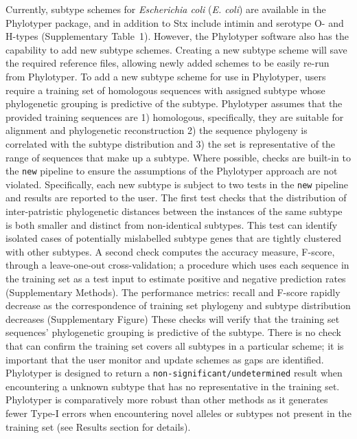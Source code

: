 \documentclass{bioinfo}
\begin{document}
Currently, subtype schemes for \emph{Escherichia coli} (\textit{E. coli}) are available in the Phylotyper package, and in addition to Stx include intimin and serotype O- and H-types  (Supplementary Table~1).
However, the Phylotyper software also has the capability to add new subtype schemes. 
Creating a new subtype scheme will save the required reference files, allowing newly added schemes to be easily re-run from Phylotyper.
To add a new subtype scheme for use in Phylotyper, users require a training set of homologous sequences with assigned subtype whose phylogenetic grouping is predictive of the subtype.
Phylotyper assumes that the provided training sequences are 1) homologous, specifically, they are suitable for alignment and phylogenetic reconstruction 2) the sequence phylogeny is correlated with the subtype distribution and 3) the set is representative of the range of sequences that make up a subtype.
Where possible, checks are built-in to the \texttt{new} pipeline to ensure the assumptions of the Phylotyper approach are not violated.
Specifically, each new subtype is subject to two tests in the \texttt{new} pipeline and results are reported to the user.
The first test checks that the distribution of inter-patristic phylogenetic distances between the instances of the same subtype is both smaller and distinct from non-identical subtypes.
This test can identify isolated cases of potentially mislabelled subtype genes that are tightly clustered with other subtypes.
A second check computes the accuracy measure, F-score, through a leave-one-out cross-validation; a procedure which uses each sequence in the training set as a test input to estimate positive and negative prediction rates (Supplementary Methods).
The performance metrics: recall and F-score rapidly decrease as the correspondence of training set phylogeny and subtype distribution decreases (Supplementary Figure)
These checks will verify that the training set sequences' phylogenetic grouping is predictive of the subtype.
There is no check that can confirm the training set covers all subtypes in a particular scheme; it is important that the user monitor and update schemes as gaps are identified.
Phylotyper is designed to return a \texttt{non-significant/undetermined} result when encountering a unknown subtype that has no representative in the training set.
Phylotyper is comparatively more robust than other methods as it generates fewer Type-I errors when encountering novel alleles or subtypes not present in the training set (see Results section for details).
\end{document}

